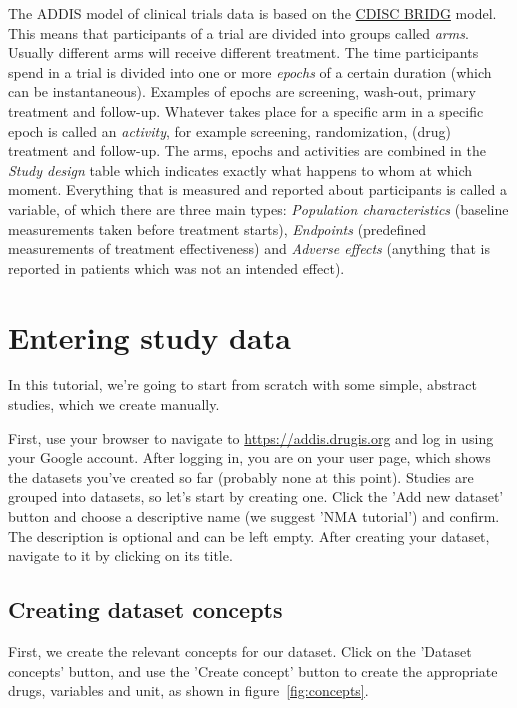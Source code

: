 \documentclass[12pt]{article}
\begin{document}
The ADDIS model of clinical trials data is based on the \href{https://www.cdisc.org/standards/domain-information-module/bridg}{CDISC BRIDG} model.
This means that participants of a trial are divided into groups called \textit{arms}.
Usually different arms will receive different treatment.
The time participants spend in a trial is divided into one or more \textit{epochs} of a certain duration (which can be instantaneous).
Examples of epochs are screening, wash-out, primary treatment and follow-up.
Whatever takes place for a specific arm in a specific epoch is called an \textit{activity}, for example screening, randomization, (drug) treatment and follow-up.
The arms, epochs and activities are combined in the \textit{Study design} table which indicates exactly what happens to whom at which moment.
Everything that is measured and reported about participants is called a variable, of which there are three main types: \textit{Population characteristics} (baseline measurements taken before treatment starts), \textit{Endpoints} (predefined measurements of treatment effectiveness) and \textit{Adverse effects} (anything that is reported in patients which was not an intended effect).

\section{Entering study data}

In this tutorial, we're going to start from scratch with some simple, abstract studies, which we create manually.

First, use your browser to navigate to \href{https://addis.drugis.org}{https://addis.drugis.org} and log in using your Google account. 
After logging in, you are on your user page, which shows the datasets you've created so far (probably none at this point).
Studies are grouped into datasets, so let's start by creating one.
Click the 'Add new dataset' button and choose a descriptive name (we suggest 'NMA tutorial') and confirm.
The description is optional and can be left empty.
After creating your dataset, navigate to it by clicking on its title.

\subsection{Creating dataset concepts}

First, we create the relevant concepts for our dataset. Click on the 'Dataset concepts' button, and use the 'Create concept' button to create the appropriate drugs, variables and unit, as shown in figure~\ref{fig:concepts}.
\end{document}
